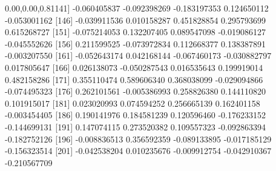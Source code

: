 \documentclass[
]{article}
\newenvironment{Shaded}{\begin{snugshade}}{\end{snugshade}}
\newcommand{\DecValTok}[1]{\textcolor[rgb]{0.00,0.00,0.81}{#1}}
\newcommand{\FloatTok}[1]{\textcolor[rgb]{0.00,0.00,0.81}{#1}}
\newcommand{\NormalTok}[1]{#1}
\newcommand{\SpecialCharTok}[1]{\textcolor[rgb]{0.00,0.00,0.00}{#1}}
\begin{document}
\begin{Shaded}
\begin{Highlighting}[]
\NormalTok{[}\DecValTok{141}\NormalTok{] }\SpecialCharTok{{-}}\FloatTok{0.060405837} \SpecialCharTok{{-}}\FloatTok{0.092398269} \SpecialCharTok{{-}}\FloatTok{0.183197353}  \FloatTok{0.124650112} \SpecialCharTok{{-}}\FloatTok{0.053001162}
\NormalTok{[}\DecValTok{146}\NormalTok{] }\SpecialCharTok{{-}}\FloatTok{0.039911536}  \FloatTok{0.010158287}  \FloatTok{0.451828854}  \FloatTok{0.295793699}  \FloatTok{0.615268727}
\NormalTok{[}\DecValTok{151}\NormalTok{] }\SpecialCharTok{{-}}\FloatTok{0.075214053}  \FloatTok{0.132207405}  \FloatTok{0.089547098} \SpecialCharTok{{-}}\FloatTok{0.019086127} \SpecialCharTok{{-}}\FloatTok{0.045552626}
\NormalTok{[}\DecValTok{156}\NormalTok{]  }\FloatTok{0.211599525} \SpecialCharTok{{-}}\FloatTok{0.073972834}  \FloatTok{0.112668377}  \FloatTok{0.138387891} \SpecialCharTok{{-}}\FloatTok{0.003207550}
\NormalTok{[}\DecValTok{161}\NormalTok{] }\SpecialCharTok{{-}}\FloatTok{0.052643174}  \FloatTok{0.042168144} \SpecialCharTok{{-}}\FloatTok{0.067460173} \SpecialCharTok{{-}}\FloatTok{0.030882797}  \FloatTok{0.017805647}
\NormalTok{[}\DecValTok{166}\NormalTok{]  }\FloatTok{0.026138073} \SpecialCharTok{{-}}\FloatTok{0.050287543}  \FloatTok{0.016535643}  \FloatTok{0.199919014}  \FloatTok{0.482158286}
\NormalTok{[}\DecValTok{171}\NormalTok{]  }\FloatTok{0.355110474}  \FloatTok{0.589606340}  \FloatTok{0.368038099} \SpecialCharTok{{-}}\FloatTok{0.029094866} \SpecialCharTok{{-}}\FloatTok{0.074495323}
\NormalTok{[}\DecValTok{176}\NormalTok{]  }\FloatTok{0.262101561} \SpecialCharTok{{-}}\FloatTok{0.005386993}  \FloatTok{0.258826380}  \FloatTok{0.144110820}  \FloatTok{0.101915017}
\NormalTok{[}\DecValTok{181}\NormalTok{]  }\FloatTok{0.023020993}  \FloatTok{0.074594252}  \FloatTok{0.256665139}  \FloatTok{0.162401158} \SpecialCharTok{{-}}\FloatTok{0.003454405}
\NormalTok{[}\DecValTok{186}\NormalTok{]  }\FloatTok{0.190141976}  \FloatTok{0.184581239}  \FloatTok{0.120596460} \SpecialCharTok{{-}}\FloatTok{0.176233152} \SpecialCharTok{{-}}\FloatTok{0.144699131}
\NormalTok{[}\DecValTok{191}\NormalTok{]  }\FloatTok{0.147074115}  \FloatTok{0.273520382}  \FloatTok{0.109557323} \SpecialCharTok{{-}}\FloatTok{0.092863394} \SpecialCharTok{{-}}\FloatTok{0.182752126}
\NormalTok{[}\DecValTok{196}\NormalTok{] }\SpecialCharTok{{-}}\FloatTok{0.008836513}  \FloatTok{0.356592359} \SpecialCharTok{{-}}\FloatTok{0.089133895} \SpecialCharTok{{-}}\FloatTok{0.017185129} \SpecialCharTok{{-}}\FloatTok{0.156323514}
\NormalTok{[}\DecValTok{201}\NormalTok{] }\SpecialCharTok{{-}}\FloatTok{0.042538204}  \FloatTok{0.010235676} \SpecialCharTok{{-}}\FloatTok{0.009912754} \SpecialCharTok{{-}}\FloatTok{0.042910367} \SpecialCharTok{{-}}\FloatTok{0.210567709}

\end{Highlighting}
\end{Shaded}
\end{document}
